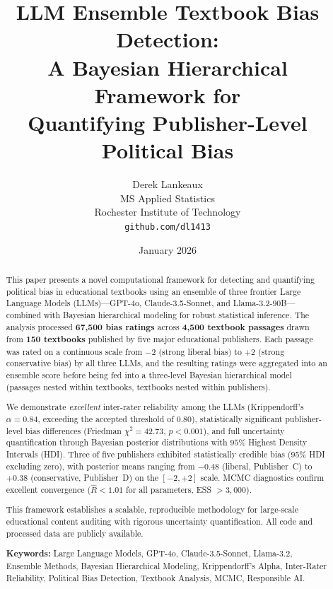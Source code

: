 \documentclass[10pt,letterpaper]{article}
\title{\textbf{LLM Ensemble Textbook Bias Detection:\\
A Bayesian Hierarchical Framework for\\
Quantifying Publisher-Level Political Bias}}
\author{%
  Derek Lankeaux\\
  MS Applied Statistics\\
  Rochester Institute of Technology\\
  \texttt{github.com/dl1413}
}
\date{January 2026}
\begin{document}

\maketitle

\begin{abstract}
This paper presents a novel computational framework for detecting and quantifying
political bias in educational textbooks using an ensemble of three frontier Large
Language Models (LLMs)---GPT-4o, Claude-3.5-Sonnet, and Llama-3.2-90B---combined
with Bayesian hierarchical modeling for robust statistical inference.  The analysis
processed \textbf{67,500 bias ratings} across \textbf{4,500 textbook passages}
drawn from \textbf{150 textbooks} published by five major educational publishers.
Each passage was rated on a continuous scale from $-2$ (strong liberal bias) to
$+2$ (strong conservative bias) by all three LLMs, and the resulting ratings were
aggregated into an ensemble score before being fed into a three-level Bayesian
hierarchical model (passages nested within textbooks, textbooks nested within
publishers).

We demonstrate \emph{excellent} inter-rater reliability among the LLMs
(Krippendorff's $\alpha = 0.84$, exceeding the accepted threshold of $0.80$),
statistically significant publisher-level bias differences (Friedman
$\chi^2 = 42.73$, $p < 0.001$), and full uncertainty quantification through
Bayesian posterior distributions with $95\%$ Highest Density Intervals (HDI).
Three of five publishers exhibited statistically credible bias (95\% HDI excluding
zero), with posterior means ranging from $-0.48$ (liberal, Publisher~C) to
$+0.38$ (conservative, Publisher~D) on the $[-2,+2]$ scale.  MCMC diagnostics
confirm excellent convergence ($\hat{R} < 1.01$ for all parameters,
ESS $> 3{,}000$).

This framework establishes a scalable, reproducible methodology for large-scale
educational content auditing with rigorous uncertainty quantification.  All code
and processed data are publicly available.

\medskip
\noindent\textbf{Keywords:} Large Language Models, GPT-4o, Claude-3.5-Sonnet,
Llama-3.2, Ensemble Methods, Bayesian Hierarchical Modeling, Krippendorff's Alpha,
Inter-Rater Reliability, Political Bias Detection, Textbook Analysis, MCMC,
Responsible AI.
\end{abstract}
\end{document}
